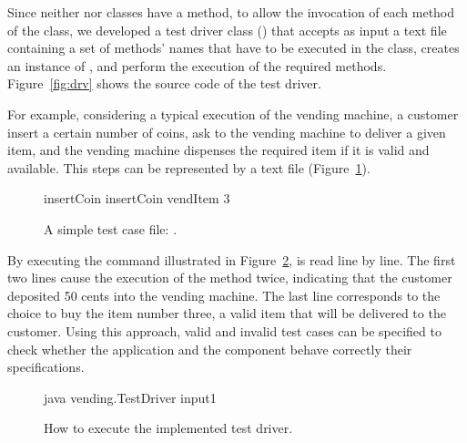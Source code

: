 

Since neither  nor  classes have
a  method, to allow the invocation of each method of the
 class, we developed a test driver class
() that accepts as input a text file containing a
set of methods' names that have to be executed in the
 class, creates an instance of
, and perform the execution of the required
methods. Figure~\ref{fig:drv} shows the source code of the test
driver.



For example, considering a typical execution of the vending
machine, a customer insert a certain number of coins, ask to the
vending machine to deliver a given item, and the vending machine
dispenses the required item if it is valid and available. This
steps can be represented by a text file 
(Figure~\ref{fig:input}).

\begin{figure}[!ht]
\begin{cmd}
        insertCoin
        insertCoin
        vendItem 3
\end{cmd}
\vspace{-0.7cm}\caption{A simple test case file:
.}\label{fig:input}
\end{figure}

By executing the command illustrated in Figure~\ref{fig:driver},
 is read line by line. The first two lines cause the
execution of the method  twice,
indicating that the customer deposited 50 cents into the vending
machine. The last line corresponds to the choice to buy the item
number three, a valid item that will be delivered to the customer.
Using this approach, valid and invalid test cases can be specified
to check whether the  application and the
 component behave correctly \wrt their
specifications.

\begin{figure}[!ht]
\begin{cmd}
        java vending.TestDriver input1
\end{cmd}
\vspace{-0.7cm}
\caption{How to execute the implemented test
driver.}\label{fig:driver}
\end{figure}


